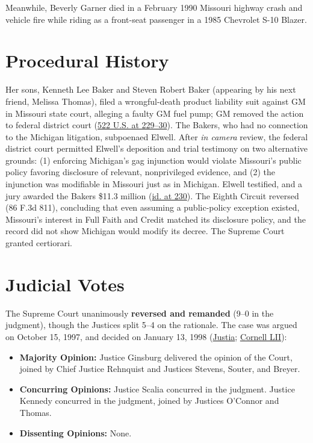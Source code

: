 \documentclass[12pt]{article}
\begin{document}
Meanwhile, Beverly Garner died in a February 1990 Missouri highway crash and vehicle fire while riding as a front-seat passenger in a 1985 Chevrolet S-10 Blazer.

\section{Procedural History}
Her sons, Kenneth Lee Baker and Steven Robert Baker (appearing by his next friend, Melissa Thomas), filed a wrongful-death product liability suit against GM in Missouri state court, alleging a faulty GM fuel pump; GM removed the action to federal district court (\href{https://www.law.cornell.edu/supremecourt/text/96-653}{522 U.S. at 229--30}). The Bakers, who had no connection to the Michigan litigation, subpoenaed Elwell. After \textit{in camera} review, the federal district court permitted Elwell's deposition and trial testimony on two alternative grounds: (1) enforcing Michigan's gag injunction would violate Missouri's public policy favoring disclosure of relevant, nonprivileged evidence, and (2) the injunction was modifiable in Missouri just as in Michigan. Elwell testified, and a jury awarded the Bakers \$11.3 million (\href{https://www.law.cornell.edu/supremecourt/text/96-653}{id. at 230}). The Eighth Circuit reversed (86 F.3d 811), concluding that even assuming a public-policy exception existed, Missouri's interest in Full Faith and Credit matched its disclosure policy, and the record did not show Michigan would modify its decree. The Supreme Court granted certiorari.

\section{Judicial Votes}
The Supreme Court unanimously \textbf{reversed and remanded} (9--0 in the judgment), though the Justices split 5--4 on the rationale. The case was argued on October 15, 1997, and decided on January 13, 1998 (\href{https://supreme.justia.com/cases/federal/us/522/222/}{Justia}; \href{https://www.law.cornell.edu/supremecourt/text/96-653}{Cornell LII}):

\begin{itemize}
    \item \textbf{Majority Opinion:} Justice Ginsburg delivered the opinion of the Court, joined by Chief Justice Rehnquist and Justices Stevens, Souter, and Breyer.
    \item \textbf{Concurring Opinions:} Justice Scalia concurred in the judgment. Justice Kennedy concurred in the judgment, joined by Justices O'Connor and Thomas.
    \item \textbf{Dissenting Opinions:} None.
\end{itemize}
\end{document}

